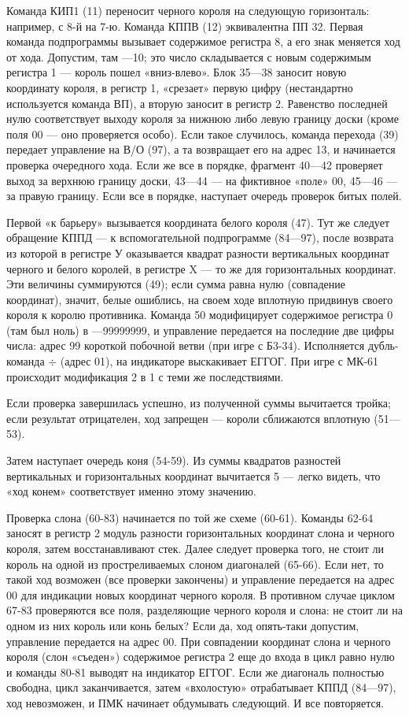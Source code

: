 \documentclass[11pt,a4paper,oneside]{article}
\begin{document}
Команда КИП1 (11) переносит черного короля на следующую горизонталь: например, с 8-й на 7-ю. Команда КППВ (12) эквивалентна ПП 32. Первая команда подпрограммы вызывает содержимое регистра 8, а его знак меняется ход от хода. Допустим, там —10; это число складывается с новым содержимым регистра 1 — король пошел «вниз-влево». Блок 35—38 заносит новую координату короля, в регистр 1, «срезает» первую цифру (нестандартно используется команда ВП), а вторую заносит в регистр 2. Равенство последней нулю соответствует выходу короля за нижнюю либо левую границу доски (кроме поля 00 — оно проверяется особо). Если такое случилось, команда перехода (39) передает управление на В/О (97), а та возвращает его на адрес 13, и начинается проверка очередного хода. Если же все в порядке, фрагмент 40—42 проверяет выход за верхнюю границу доски, 43—44 — на фиктивное «поле» 00, 45—46 — за правую границу. Если все в порядке, наступает очередь проверок битых полей.

Первой «к барьеру» вызывается координата белого короля (47). Тут же следует обращение КППД — к вспомогательной подпрограмме (84—97), после возврата из которой в регистре У оказывается квадрат разности вертикальных координат черного и белого королей, в регистре X — то же для горизонтальных координат. Эти величины суммируются (49); если сумма равна нулю (совпадение координат), значит, белые ошиблись, на своем ходе вплотную придвинув своего короля к королю противника. Команда 50 модифицирует содержимое регистра 0 (там был ноль) в —99999999, и управление передается на последние две цифры числа: адрес 99 короткой побочной ветви (при игре с Б3-34). Исполняется дубль-команда $\div$ (адрес 01), на индикаторе выскакивает ЕГГОГ. При игре с МК-61 происходит модификация 2 в 1 с теми же последствиями.

Если проверка завершилась успешно, из полученной суммы вычитается тройка; если результат отрицателен, ход запрещен — короли сближаются вплотную (51—53).

Затем наступает очередь коня (54-59). Из суммы квадратов разностей вертикальных и горизонтальных координат вычитается 5 — легко видеть, что «ход конем» соответствует именно этому значению.

Проверка слона (60-83) начинается по той же схеме (60-61). Команды 62-64 заносят в регистр 2 модуль разности горизонтальных координат слона и черного короля, затем восстанавливают стек. Далее следует проверка того, не стоит ли король на одной из простреливаемых слоном диагоналей (65-66). Если нет, то такой ход возможен (все проверки закончены) и управление передается на адрес 00 для индикации новых координат черного короля. В противном случае циклом 67-83 проверяются все поля, разделяющие черного короля и слона: не стоит ли на одном из них король или конь белых? Если да, ход опять-таки допустим, управление передается на адрес 00. При совпадении координат слона и черного короля (слон «съеден») содержимое регистра 2 еще до входа в цикл равно нулю и команды 80-81 выводят на индикатор ЕГГОГ. Если же диагональ полностью свободна, цикл заканчивается, затем «вхолостую» отрабатывает КППД (84—97), ход невозможен, и ПМК начинает обдумывать следующий. И все повторяется.
\end{document}

